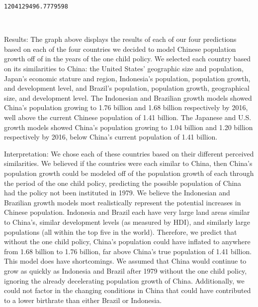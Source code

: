 \documentclass[11pt]{article}
\begin{document}
    \begin{Verbatim}[commandchars=\\\{\}]
1204129496.7779598

    \end{Verbatim}

    \begin{center}
    \end{center}
    { \hspace*{\fill} \\}
    
    Results: The graph above displays the results of each of our four
predictions based on each of the four countries we decided to model
Chinese population growth off of in the years of the one child policy.
We selected each country based on its similarities to China: the United
States' geographic size and population, Japan's economic stature and
region, Indonesia's population, population growth, and development
level, and Brazil's population, population growth, geographical size,
and development level. The Indonesian and Brazilian growth models showed
China's population growing to 1.76 billion and 1.68 billion respectively
by 2016, well above the current Chinese population of 1.41 billion. The
Japanese and U.S. growth models showed China's population growing to
1.04 billion and 1.20 billion respectively by 2016, below China's
current population of 1.41 billion.

    Interpretation: We chose each of these countries based on their
different perceived similarities. We believed if the countries were each
similar to China, then China's population growth could be modeled off of
the population growth of each through the period of the one child
policy, predicting the possible population of China had the policy not
been instituted in 1979. We believe the Indonesian and Brazilian growth
models most realistically represent the potential increases in Chinese
population. Indonesia and Brazil each have very large land areas similar
to China's, similar development levels (as measured by HDI), and
similarly large populations (all within the top five in the world).
Therefore, we predict that without the one child policy, China's
population could have inflated to anywhere from 1.68 billion to 1.76
billion, far above China's true population of 1.41 billion. This model
does have shortcomings. We assumed that China would continue to grow as
quickly as Indonesia and Brazil after 1979 without the one child policy,
ignoring the already decelerating population growth of China.
Additionally, we could not factor in the changing conditions in China
that could have contributed to a lower birthrate than either Brazil or
Indonesia.


    
    
    
    
\end{document}
